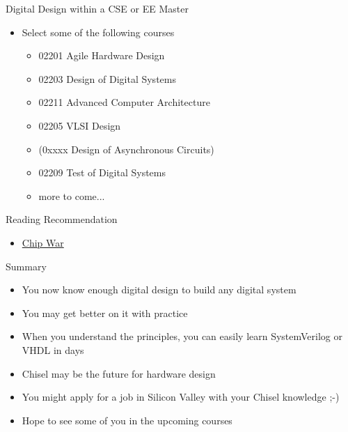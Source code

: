 \begin{frame}[fragile]{Digital Design within a CSE or EE Master}
\begin{itemize}
\item Select some of the following courses
\begin{itemize}
\item 02201 Agile Hardware Design 
\item 02203 Design of Digital Systems
\item 02211 Advanced Computer Architecture
\item 02205 VLSI Design
\item (0xxxx Design of Asynchronous Circuits)
\item 02209 Test of Digital Systems
\item more to come...
\end{itemize}
\end{itemize}
\end{frame}

\begin{frame}[fragile]{Reading Recommendation}
\begin{itemize}
\item \href{https://www.amazon.com/Chip-War-Worlds-Critical-Technology/dp/1982172002}{Chip War}
\end{itemize}
\end{frame}

\begin{frame}[fragile]{Summary}
\begin{itemize}
\item You now know enough digital design to build any digital system
\item You may get better on it with practice
\item When you understand the principles, you can easily learn SystemVerilog or VHDL in days
\item Chisel may be the future for hardware design
\item You might apply for a job in Silicon Valley with your Chisel knowledge ;-)
\item Hope to see some of you in the upcoming courses
\end{itemize}
\end{frame}





